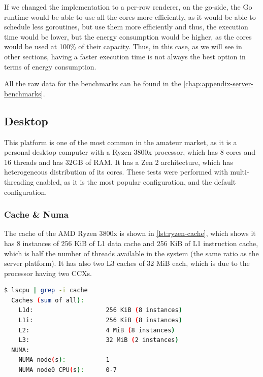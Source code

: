 If we changed the implementation to a per-row renderer, on the go-side, the Go runtime would be able to use all the cores more efficiently, as it would be able to schedule less goroutines, but use them more efficiently and thus, the execution time would be lower, but the energy consumption would be higher, as the cores would be used at 100\% of their capacity. Thus, in this case, as we will see in other sections, having a faster execution time is not always the best option in terms of energy consumption.


All the raw data for the benchmarks can be found in the \autoref{chap:appendix-server-benchmarks}.




\subsection{Desktop}
This platform is one of the most common in the amateur market, as it is a personal desktop computer with a Ryzen 3800x processor, which has 8 cores and 16 threads and has 32GB of RAM. It has a Zen 2 architecture, which has heterogeneous distribution of its cores. These tests were performed with multi-threading enabled, as it is the most popular configuration, and the default configuration.

\subsubsection{Cache \& Numa}
The cache of the AMD Ryzen 3800x is shown in \autoref{lst:ryzen-cache}, which shows it has 8 instances of 256 KiB of L1 data cache and 256 KiB of L1 instruction cache, which is half the number of threads available in the system (the same ratio as the server platform). It has also two L3 caches of 32 MiB each, which is due to the processor having two \glspl{CCX}. 

\begin{lstlisting}[language=bash, caption={Cache of the AMD Ryzen 3800x}, label={lst:ryzen-cache}]
  $ lscpu | grep -i cache
  Caches (sum of all):
    L1d:                    256 KiB (8 instances)
    L1i:                    256 KiB (8 instances)
    L2:                     4 MiB (8 instances)
    L3:                     32 MiB (2 instances)
  NUMA:
    NUMA node(s):           1
    NUMA node0 CPU(s):      0-7
  \end{lstlisting}


